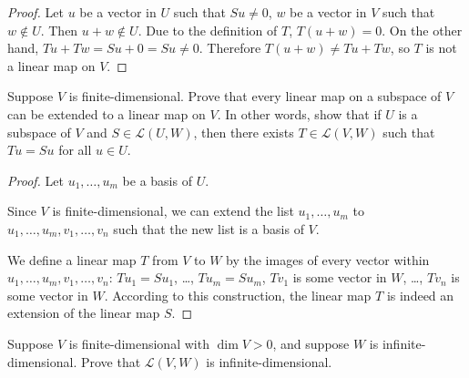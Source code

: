 \begin{proof}
    Let $u$ be a vector in $U$ such that $Su\ne 0$, $w$ be a vector in $V$ such that $w\notin U$. Then $u + w\notin U$. Due to the definition of $T$, $T(u + w) = 0$. On the other hand, $Tu + Tw = Su + 0 = Su\ne 0$. Therefore $T(u + w)\ne Tu + Tw$, so $T$ is not a linear map on $V$.
\end{proof}
\newpage


\begin{exercise}\label{chapter3:sectionA:exercise13}
    Suppose $V$ is finite-dimensional. Prove that every linear map on a subspace of $V$ can be extended to a linear map on $V$. In other words, show that if $U$ is a subspace of $V$ and $S \in \mathcal{L}(U, W)$, then there exists $T\in \mathcal{L}(V, W)$ such that $Tu = Su$ for all $u\in U$.
\end{exercise}

\begin{proof}
    Let $u_{1}, \ldots, u_{m}$ be a basis of $U$.

    Since $V$ is finite-dimensional, we can extend the list $u_{1}, \ldots, u_{m}$ to $u_{1}, \ldots, u_{m}, v_{1}, \ldots, v_{n}$ such that the new list is a basis of $V$.

    We define a linear map $T$ from $V$ to $W$ by the images of every vector within $u_{1}, \ldots, u_{m}, v_{1}, \ldots, v_{n}$: $Tu_{1} = Su_{1}$, \ldots, $Tu_{m} = Su_{m}$, $Tv_{1}$ is some vector in $W$, \ldots, $Tv_{n}$ is some vector in $W$. According to this construction, the linear map $T$ is indeed an extension of the linear map $S$.
\end{proof}
\newpage

\begin{exercise}
    Suppose $V$ is finite-dimensional with $\dim V > 0$, and suppose $W$ is infinite-dimensional. Prove that $\mathcal{L}(V, W)$ is infinite-dimensional.
\end{exercise}

